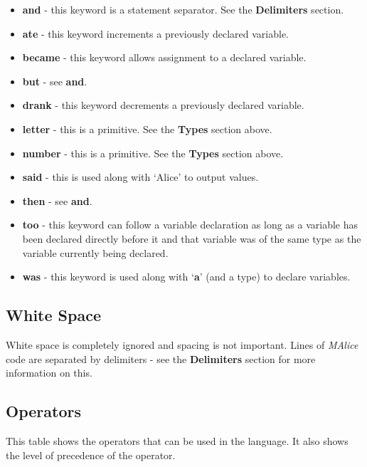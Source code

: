 \documentclass[a4, 11pt]{article}
\begin{document}
\begin{itemize}
  \item \textbf{and} - this keyword is a statement separator. See the \textbf{Delimiters} section.
  \item \textbf{ate} - this keyword increments a previously declared variable.
  \item \textbf{became} - this keyword allows assignment to a declared variable.
  \item \textbf{but} - see \textbf{and}.
  \item \textbf{drank} - this keyword decrements a previously declared variable.
  \item \textbf{letter} - this is a primitive. See the \textbf{Types} section above.
  \item \textbf{number} - this is a primitive. See the \textbf{Types} section above.
  \item \textbf{said} - this is used along with \textquoteleft Alice\textquoteright{} to output values.
  \item \textbf{then} - see \textbf{and}.
  \item \textbf{too} - this keyword can follow a variable declaration as long as a variable has been declared directly before it and that variable was of the same type as the variable currently being declared.
  \item \textbf{was} - this keyword is used along with \textquoteleft \textbf{a}\textquoteright{} (and a type) to declare variables.
\end{itemize}

\subsection*{White Space}
White space is completely ignored and spacing is not important. Lines of \emph{MAlice} code are separated by delimiters - see the \textbf{Delimiters} section for more information on this.

\subsection*{Operators}
This table shows the operators that can be used in the language. It also shows the level of precedence of the operator.
\end{document}
